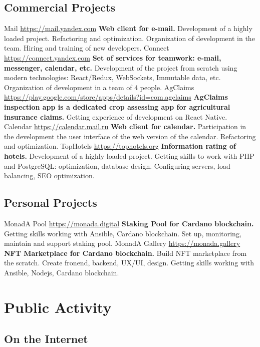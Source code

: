\documentclass[11pt,a4paper]{moderncv}
\begin{document}
  \subsection{Commercial Projects}
  \cvline
    {Mail}
    {\url{https://mail.yandex.com}\newline{}
    \textbf{Web client for e-mail.}\newline{}
    Development of a highly loaded project. Refactoring and optimization.\newline{}
    Organization of development in the team. Hiring and training of new developers.}
  \cvline
    {Connect}
    {\url{https://connect.yandex.com}\newline{}
    \textbf{Set of services for teamwork: e-mail, messenger, calendar, etc.}\newline{}
    Development of the project from scratch using modern technologies:
    React/Redux, WebSockets, Immutable data, etc.
    Organization of development in a team of 4 people.}
  \cvline
    {AgClaims}
    {\url{https://play.google.com/store/apps/details?id=com.agclaims}\newline{}
    \textbf{AgClaims inspection app is a dedicated crop assessing app for agricultural insurance claims.}\newline{}
    Getting experience of development on React Native.}
  \cvline
    {Calendar}
    {\url{https://calendar.mail.ru}\newline{}
    \textbf{Web client for calendar.}\newline{}
    Participation in the development the user interface of the web version of the calendar.\newline{}
    Refactoring and optimization.}
  \cvline
    {TopHotels}
    {\url{https://tophotels.org}\newline{}
    \textbf{Information rating of hotels.}\newline{}
    Development of a highly loaded project.
    Getting skills to work with PHP and PostgreSQL: optimization, database design.
    Configuring servers, load balancing, SEO optimization.}
  \subsection{Personal Projects}
  \cvline
    {MonadA Pool}
    {\url{https://monada.digital}\newline{}
    \textbf{Staking Pool for Cardano blockchain.}\newline{}
    Getting skills working with Ansible, Cardano blockchain. Set up, monitoring, maintain and support staking pool.}
  \cvline
    {MonadA Gallery}
    {\url{https://monada.gallery}\newline{}
    \textbf{NFT Marketplace for Cardano blockchain.}\newline{}
    Build NFT marketplace from the scratch. Create fronend, backend, UX/UI, design. Getting skills working with Ansible, Nodejs, Cardano blockchain.}

\newpage

\section{Public Activity}
  \subsection{On the Internet}
\end{document}
